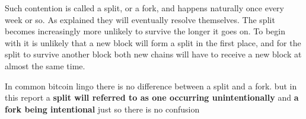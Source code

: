 Such contention is called a split, or a fork, and happens naturally once every week or so. As explained they will eventually resolve themselves. The split becomes increasingly more unlikely to survive the longer it goes on. To begin with it is unlikely that a new block will form a split in the first place, and for the split to survive another block both new chains will have to receive a new block at almost the same time.

In common bitcoin lingo there is no difference between a split and a fork. but in this report a \textbf{split will referred to as one occurring unintentionally} and \textbf{a fork being intentional} just so there is no confusion

\lipsum[1-2]